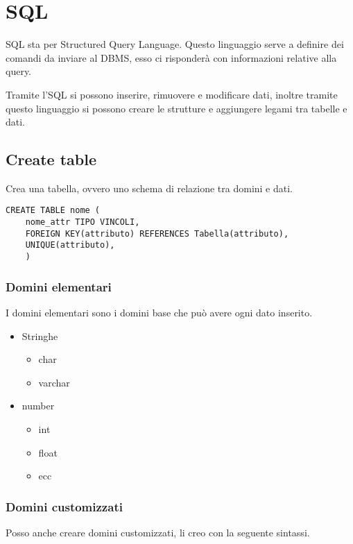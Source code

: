 \chapter{SQL}

SQL sta per Structured Query Language. Questo linguaggio serve a definire dei comandi da inviare al DBMS, esso ci risponderà con informazioni relative alla query.

Tramite l'SQL si possono inserire, rimuovere e modificare dati, inoltre tramite questo linguaggio si possono creare le strutture e aggiungere legami tra tabelle e dati.

\section{Create table}

Crea una tabella, ovvero uno schema di relazione tra domini e dati.

\begin{lstlisting}
CREATE TABLE nome (
    nome_attr TIPO VINCOLI,
    FOREIGN KEY(attributo) REFERENCES Tabella(attributo),
    UNIQUE(attributo),
    )
\end{lstlisting}

\subsection{Domini elementari}
I domini elementari sono i domini base che può avere ogni dato inserito.

\begin{itemize}
    \item Stringhe
    \begin{itemize}
        \item char
        \item varchar
    \end{itemize}
    \item number
    \begin{itemize}
        \item int
        \item float
        \item ecc
    \end{itemize}
\end{itemize}

\subsection{Domini customizzati}

Posso anche creare domini customizzati, li creo con la seguente sintassi.

